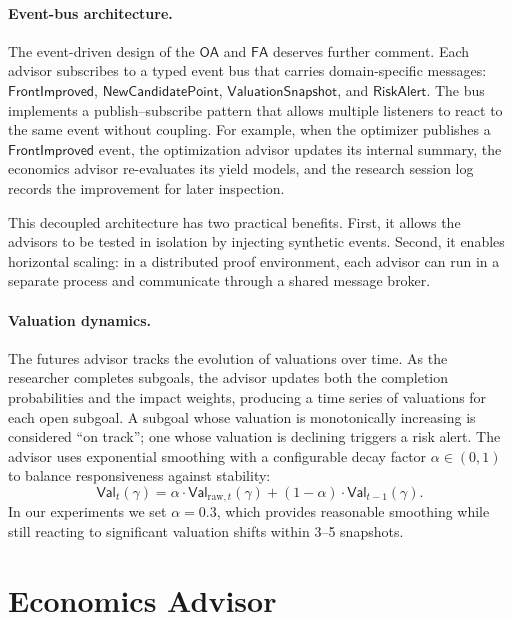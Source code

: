 \documentclass[11pt]{article}
\newcommand{\OA}{\mathsf{OA}}
\newcommand{\FA}{\mathsf{FA}}
\newcommand{\Valuation}{\mathsf{Val}}
\begin{document}
\paragraph{Event-bus architecture.}
The event-driven design of the $\OA$ and $\FA$ deserves further
comment.  Each advisor subscribes to a typed event bus that
carries domain-specific messages: $\mathsf{FrontImproved}$,
$\mathsf{NewCandidatePoint}$, $\mathsf{ValuationSnapshot}$,
and $\mathsf{RiskAlert}$.  The bus implements a
publish--subscribe pattern that allows multiple listeners to
react to the same event without coupling.  For example, when the
optimizer publishes a $\mathsf{FrontImproved}$ event, the
optimization advisor updates its internal summary, the economics
advisor re-evaluates its yield models, and the research session
log records the improvement for later inspection.

This decoupled architecture has two practical benefits.  First,
it allows the advisors to be tested in isolation by injecting
synthetic events.  Second, it enables horizontal scaling: in a
distributed proof environment, each advisor can run in a separate
process and communicate through a shared message broker.

\paragraph{Valuation dynamics.}
The futures advisor tracks the evolution of valuations over time.
As the researcher completes subgoals, the advisor updates both the
completion probabilities and the impact weights, producing a time
series of valuations for each open subgoal.  A subgoal whose
valuation is monotonically increasing is considered ``on track'';
one whose valuation is declining triggers a risk alert.  The
advisor uses exponential smoothing with a configurable decay
factor $\alpha \in (0, 1)$ to balance responsiveness against
stability:
\[
  \Valuation_t(\gamma) = \alpha \cdot \Valuation_{\mathrm{raw},t}(\gamma)
  + (1 - \alpha) \cdot \Valuation_{t-1}(\gamma).
\]
In our experiments we set $\alpha = 0.3$, which provides
reasonable smoothing while still reacting to significant
valuation shifts within 3--5 snapshots.

\section{Economics Advisor}\label{sec:economics}
\end{document}
